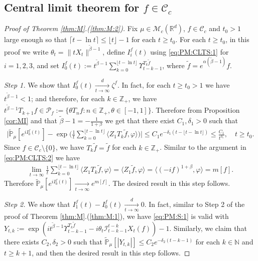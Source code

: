 \documentclass[12pt,a4paper]{amsart}
\theoremstyle{plain}
\theoremstyle{definition}
\numberwithin{equation}{section}
\begin{document}
\subsection{Central limit theorem for $f \in \mathcal C_c$}
\begin{proof}[Proof of Theorem \ref{thm:M}.(\ref{thm:M:2})]
  Fix $\mu\in \mathcal M_c(\mathbb R^d)$, $f\in \mathcal C_c$ and $t_0 > 1$ large enough so that $ \lceil t - \ln t\rceil \leq \lfloor t \rfloor - 1$ for each $t\geq t_0$.
  For each $t\geq t_0$, in this proof we write $\theta_t = \|t X_t\|^{\tilde \beta - 1}$,  define $I_i^f(t)$ using \eqref{eq:PM:CLTS:1}  for $i = 1,2,3$, and set $ I^f_0(t) := t^{\tilde \beta - 1}\sum_{k=0}^{\lfloor t-\ln t \rfloor} \Upsilon_{t-k-1}^{T_{k} \tilde f}$, where $\tilde f = e^{\alpha(\tilde \beta - 1)} f$.

  \emph{Step 1.} We show that $I^f_0(t) \xrightarrow[t\to \infty]{d} \zeta^f$.
  In fact, for each $t \geq  t_0 > 1$ we have $t^{\tilde \beta - 1} < 1$; and therefore, for each $k \in \mathbb Z_+$, we have $t^{\tilde \beta - 1} T_{k+1} f \in \mathcal P_f:=\{\theta T_n f: n \in \mathbb Z_+, \theta \in [-1,1]\}$.
  Therefore from Proposition \ref{cor:MI} and that $\tilde \beta - 1 = -\frac{1}{1+\beta}$ we get that there exist $C_1,\delta_1 > 0$ such that
  \begin{align}
    \Big|\mathbb{\widetilde{P}}_{\mu} [e^{i I^f_0(t)} ]-\exp\Big(\frac{1}{t}\sum_{k=0}^{\lfloor t-\ln t \rfloor} \langle Z_1T_{k}\tilde f, \varphi\rangle \Big)\Big|
    \leq C_1 e^{-\delta_1(t - \lfloor t - \ln t\rfloor)}
    \leq \frac{C_1}{t^{\delta_1}},
    \quad t\geq t_0.
  \end{align}
  Since $f \in \mathcal C_c\setminus \{0\}$, we have $T_k \tilde f = \tilde f$ for each $k \in \mathbb Z_+$.
  Similar to the argument in \eqref{eq:PM:CLTS:2} we have
  \begin{align}
    \label{CLT:C:eq:m}
    \lim_{t\to \infty} \frac{1}{t}\sum_{k=0}^{\lfloor t-\ln t \rfloor} \langle Z_1 T_{k}\tilde f, \varphi\rangle
    = \langle Z_1 \tilde f,\varphi \rangle
    = \langle (-if)^{1+\beta}, \varphi \rangle
    = m[f].
  \end{align}
  Therefore $\mathbb {\widetilde P}_\mu[e^{i I^f_0(t)}] \xrightarrow[t\to \infty]{} e^{m[f]}$.
  The desired result in this step follows.

  \emph{Step 2.} We show that $ I^f_1(t) - I^f_0 (t) \xrightarrow[t\to \infty]{d} 0$.
  In fact, similar to Step 2 of the proof of Theorem \ref{thm:M}.(\ref{thm:M:1}), we  have \eqref{eq:PM:S:1} is valid with $ Y_{t,k} := \exp(i t^{\tilde \beta - 1} \Upsilon_{t-k-1}^{T_{k}\tilde f} - i\theta_t \mathcal I_{t-k-1}^{t-k} X_t(f)) - 1$.
  Similarly, we claim that there exists $C_2, \delta_2>0$ such that $\widetilde {\mathbb P}_\mu [|Y_{t,k}|] \leq C_2 e^{-\delta_2 (t-k-1)}$ for each $k\in \mathbb N$ and $t\geq k+1$, and  then the desired result in this step follows.


\end{proof}
\end{document}
